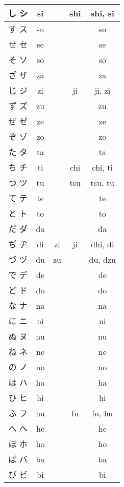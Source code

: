 \documentclass{article}
\begin{document}
\begin{center}
\begin{japanese}
\begin{longtable}{|c|c c c|c|}
                し シ & si && shi & shi, si \\ \hline
                す ス & su &&& su \\ \hline
                せ セ & se &&& se \\ \hline
                そ ソ & so &&& so \\ \hline
                ざ ザ & za &&& za \\ \hline
                じ ジ & zi && ji & ji, zi \\ \hline
                ず ズ & zu &&& zu \\ \hline
                ぜ ゼ & ze &&& ze \\ \hline
                ぞ ゾ & zo &&& zo \\ \hline
                た タ & ta &&& ta \\ \hline
                ち チ & ti && chi & chi, ti \\ \hline
                つ ツ & tu && tsu & tsu, tu \\ \hline
                て テ & te &&& te \\ \hline
                と ト & to &&& to \\ \hline
                だ ダ & da &&& da \\ \hline
                ぢ ヂ & di & zi & ji & dhi, di \\ \hline
                づ ヅ & du & zu && du, dzu \\ \hline
                で デ & de &&& de \\ \hline
                ど ド & do &&& do \\ \hline
                な ナ & na &&& na \\ \hline
                に ニ & ni &&& ni \\ \hline
                ぬ ヌ & nu &&& nu \\ \hline
                ね ネ & ne &&& ne \\ \hline
                の ノ & no &&& no \\ \hline
                は ハ & ha &&& ha \\ \hline
                ひ ヒ & hi &&& hi \\ \hline
                ふ フ & hu && fu & fu, hu \\ \hline
                へ ヘ & he &&& he \\ \hline
                ほ ホ & ho &&& ho \\ \hline
                ば バ & ba &&& ba \\ \hline
                び ビ & bi &&& bi \\ \hline

\end{longtable}
\end{japanese}
\end{center}
\end{document}
